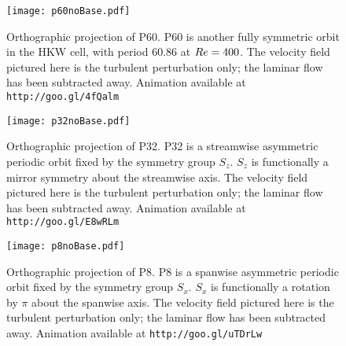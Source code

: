 \begin{figure}
\centerline{\texttt{[image: p60noBase.pdf]}}
\caption[Orthographic projection of P60.]{Orthographic projection of P60. P60 is another fully symmetric orbit  in the HKW cell, with period 60.86 at $Re = 400$.  The velocity field pictured here is the turbulent perturbation only; the laminar flow has been subtracted away.{ Animation available at {\tt http://goo.gl/4fQalm}}}\label{fig:p60}
\end{figure}


\begin{figure}
\centerline{\texttt{[image: p32noBase.pdf]}}
\caption[Orthographic projection of P32.]{Orthographic projection of P32. P32 is a streamwise asymmetric periodic orbit fixed by the symmetry group $S_z$. $S_z$  is functionally a mirror symmetry about the streamwise axis. The velocity field pictured here is the turbulent perturbation only; the laminar flow has been subtracted away. Animation available at {\tt http://goo.gl/E8wRLm}}\label{fig:p32}
\end{figure}


\begin{figure}
\centerline{\texttt{[image: p8noBase.pdf]}}
\caption[Orthographic projection of P8.]{Orthographic projection of P8. P8 is a spanwise asymmetric periodic orbit fixed by the symmetry group $S_x$. $S_x$ is functionally a rotation by $\pi$ about the spanwise axis. The velocity field pictured here is the turbulent perturbation only; the laminar flow has been subtracted away. Animation available at {\tt http://goo.gl/uTDrLw}}\label{fig:p8}
\end{figure}

\clearpage
